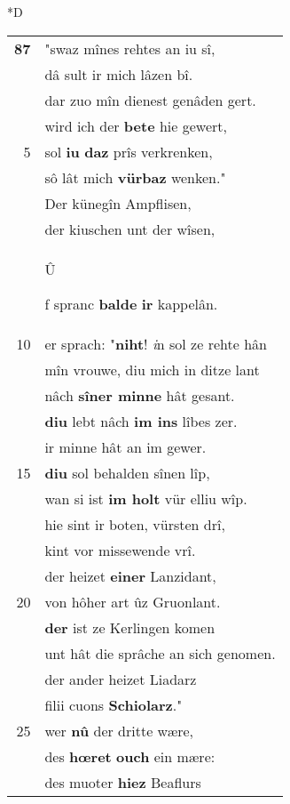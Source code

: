 \documentclass[8pt,a4paper,notitlepage]{article}
\begin{document}
\begin{table}[ht]
\begin{minipage}[t]{0.5\linewidth}
\small
\begin{center}*D
\end{center}
\begin{tabular}{rl}
\textbf{87} & "swaz mînes rehtes an iu sî,\\ 
 & dâ sult ir mich lâzen bî.\\ 
 & dar zuo mîn dienest genâden gert.\\ 
 & wird ich der \textbf{bete} hie gewert,\\ 
5 & sol \textbf{iu} \textbf{daz} prîs verkrenken,\\ 
 & sô lât mich \textbf{vürbaz} wenken."\\ 
 & Der künegîn Ampflisen,\\ 
 & der kiuschen unt der wîsen,\\ 
 & \begin{large}Û\end{large}f spranc \textbf{balde} \textbf{ir} kappelân.\\ 
10 & er sprach: "\textbf{niht}! \textit{i}n sol ze rehte hân\\ 
 & mîn vrouwe, diu mich in ditze lant\\ 
 & nâch \textbf{sîner minne} hât gesant.\\ 
 & \textbf{diu} lebt nâch \textbf{im ins} lîbes zer.\\ 
 & ir minne hât an im gewer.\\ 
15 & \textbf{diu} sol behalden sînen lîp,\\ 
 & wan si ist \textbf{im holt} vür elliu wîp.\\ 
 & hie sint ir boten, vürsten drî,\\ 
 & kint vor missewende vrî.\\ 
 & der heizet \textbf{einer} Lanzidant,\\ 
20 & von hôher art ûz Gruonlant.\\ 
 & \textbf{der} ist ze Kerlingen komen\\ 
 & unt hât die sprâche an sich genomen.\\ 
 & der ander heizet Liadarz\\ 
 & filii cuons \textbf{Schiolarz}."\\ 
25 & wer \textbf{nû} der dritte wære,\\ 
 & des \textbf{hœret} \textbf{ouch} ein mære:\\ 
 & des muoter \textbf{hiez} Beaflurs\\ 

\end{tabular}
\end{minipage}
\end{table}
\end{document}
